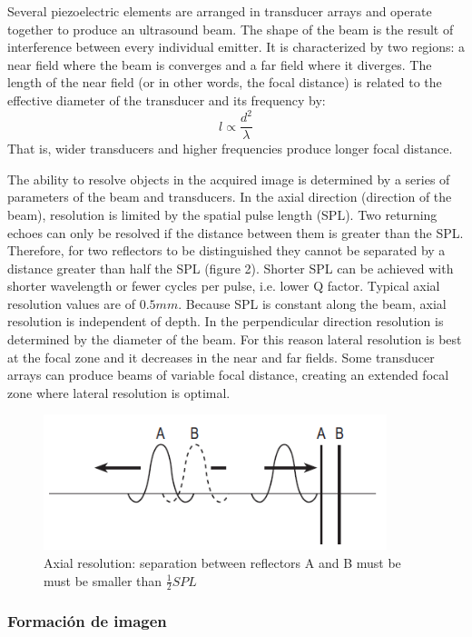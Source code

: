 \documentclass[11pt]{article} %
\begin{document}
	
	Several piezoelectric elements are arranged in transducer arrays and operate together to produce an ultrasound beam. The shape of the beam is the result of interference between every individual emitter. It is characterized by two regions: a near field where the beam is converges and a far field where it diverges. The length of the near field (or in other words, the focal distance) is related to the effective diameter of the transducer and its frequency by: \[ l \propto \frac{d^2}{\lambda} \] That is, wider transducers and higher frequencies produce longer focal distance.

	
	The ability to resolve objects in the acquired image is determined by a series of parameters of the beam and transducers. In the axial direction (direction of the beam), resolution is limited by the spatial pulse length (SPL). Two returning echoes can only be resolved if the distance between them is greater than the SPL. Therefore, for two reflectors to be distinguished they cannot be separated by a distance greater than half the SPL (figure 2). Shorter SPL can be achieved with shorter wavelength or fewer cycles per pulse, i.e. lower Q factor. Typical axial resolution values are of $0.5 mm$. Because SPL is constant along the beam, axial resolution is independent of depth.
In the perpendicular direction resolution is determined by the diameter of the beam. For this reason lateral resolution is best at the focal zone and it decreases in the near and far fields. Some transducer arrays can produce beams of variable focal distance, creating an extended focal zone where lateral resolution is optimal. 

	\begin{figure}
	\centering
	\includegraphics[width=10cm]{figuras/resolution.png}
	\caption{Axial resolution: separation between reflectors A and B must be must 		be smaller than $\frac{1}{2} SPL$ \cite{farr}}
	\end{figure}


\subsubsection{Formación de imagen}
	
\end{document}
